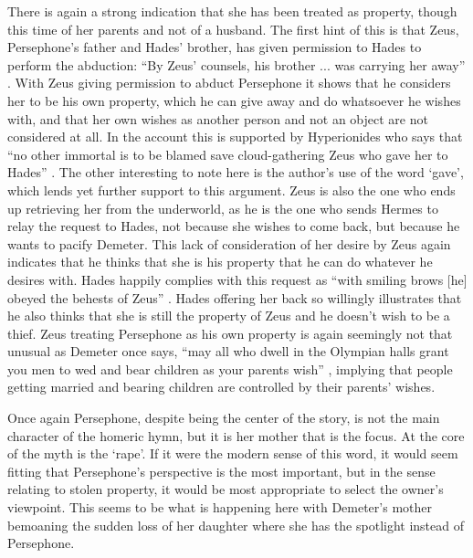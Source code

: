 \documentclass[11pt]{article}
\begin{document}
There is again a strong indication that she has been treated as property, though this time of her parents and not of a husband.
The first hint of this is that Zeus, Persephone's father and Hades' brother, has given permission to Hades to perform the abduction: ``By Zeus' counsels, his brother ... was carrying her away'' \cite[line 30]{persephone}.
With Zeus giving permission to abduct Persephone it shows that he considers her to be his own property, which he can give away and do whatsoever he wishes with, and that her own wishes as another person and not an object are not considered at all.
In the account this is supported by Hyperionides who says that ``no other immortal is to be blamed save cloud-gathering Zeus who gave her to Hades'' \cite[line 78]{persephone}.
The other interesting to note here is the author's use of the word `gave', which lends yet further support to this argument.
Zeus is also the one who ends up retrieving her from the underworld, as he is the one who sends Hermes to relay the request to Hades, not because she wishes to come back, but because he wants to pacify Demeter.
This lack of consideration of her desire by Zeus again indicates that he thinks that she is his property that he can do whatever he desires with.
Hades happily complies with this request as ``with smiling brows [he] obeyed the behests of Zeus'' \cite[line 388]{persephone}.
Hades offering her back so willingly illustrates that he also thinks that she is still the property of Zeus and he doesn't wish to be a thief.
Zeus treating Persephone as his own property is again seemingly not that unusual as Demeter once says,
``may all who dwell in the Olympian halls grant you men to wed and bear children as your parents wish'' \cite[line 136]{persephone}, implying that people getting married and bearing children are controlled by their parents' wishes.

Once again Persephone, despite being the center of the story, is not the main character of the homeric hymn, but it is her mother that is the focus.
At the core of the myth is the `rape'.
If it were the modern sense of this word, it would seem fitting that Persephone's perspective is the most important, but in the sense relating to stolen property, it would be most appropriate to select the owner's viewpoint.
This seems to be what is happening here with Demeter's mother bemoaning the sudden loss of her daughter where she has the spotlight instead of Persephone.
\end{document}
